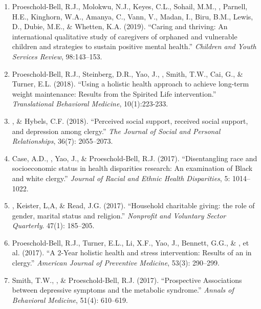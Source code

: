 \begin{enumerate}
\item Proeschold-Bell, R.J., Molokwu, N.J., Keyes, C.L., Sohail, M.M., \Eagle, Parnell, H.E., Kinghorn, W.A., Amanya, C., Vann, V., Madan, I., Biru, B.M., Lewis, D., Dubie, M.E., \& Whetten, K.A. (2019). ``Caring and thriving: An international qualitative study of caregivers of orphaned and vulnerable children and strategies to sustain positive mental health.''  \emph{Children and Youth Services Review}, 98:143--153.  

\item Proeschold-Bell, R.J., Steinberg, D.R., Yao, J., \Eagle, Smith, T.W., Cai, G., \& Turner, E.L. (2018). ``Using a holistic health approach to achieve long-term weight maintenance: Results from the Spirited Life intervention.'' \emph{Translational Behavioral Medicine}, 10(1):223-233. 

\item \Eagle, \& Hybels, C.F. (2018). ``Perceived social support, received social support, and depression among clergy.'' \emph{The Journal of Social and Personal Relationships}, 36(7): 2055--2073. 

\item Case, A.D., \Eagle, Yao, J., \& Proeschold-Bell, R.J. (2017). ``Disentangling race and socioeconomic status in health disparities research: An examination of Black and white clergy.'' \emph{Journal of Racial and Ethnic Health Disparities}, 5: 1014--1022. 

\item \Eagle, Keister, L,A, \& Read, J.G. (2017). ``Household charitable giving: the role of gender, marital status and religion.'' \emph{Nonprofit and Voluntary Sector Quarterly}. 47(1): 185--205. 

\item Proeschold-Bell, R.J., Turner, E.L., Li, X.F., Yao, J., Bennett, G.G., \& \Eagle, et al. (2017). ``A 2-Year holistic health and stress intervention: Results of an  in clergy.'' \emph{American Journal of Preventive Medicine}, 53(3): 290--299. 

\item Smith, T.W., \Eagle\CF, \& Proeschold-Bell, R.J. (2017). ``Prospective Associations between depressive symptoms and the metabolic syndrome.'' \emph{Annals of Behavioral Medicine}, 51(4): 610--619. 


\end{enumerate}
